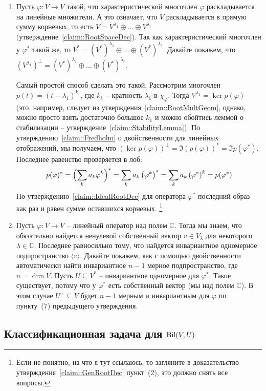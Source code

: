\begin{enumerate}
\item Пусть $\varphi\colon V\to V$ такой, что характеристический многочлен $\varphi$ раскладывается на линейные множители.
А это означает, что $V$ раскладывается в прямую сумму корневых, то есть $V = V^{\lambda_1}\oplus \ldots \oplus V^{\lambda_r}$ (утверждение~\ref{claim::RootSpaceDec}).
Так как характеристический многочлен у $\varphi^*$ такой же, то $V^* = (V^*)^{\lambda_1}\oplus \ldots \oplus (V^*)^{\lambda_r}$.
Давайте покажем, что $(V^{\lambda_1})^\bot = (V^*)^{\lambda_2}\oplus \ldots \oplus (V^*)^{\lambda_r}$.

Самый простой способ сделать это такой.
Рассмотрим многочлен $p(t) = (t-\lambda_1)^{k_1}$, где $k_1$ -- кратность $\lambda_1$ в $\chi_\varphi$.
Тогда $V^{\lambda_1} = \ker p(\varphi)$ (это, например, следует из утверждения~\ref{claim::RootMultGeom}, однако, можно просто взять достаточно большое $k_1$ и можно обойтись леммой о стабилизации -- утверждение~\ref{claim::StabilityLemma}).
По утверждению~\ref{claim::Fredholm} о двойственности для линейных отображений, мы получаем, что $(\ker p(\varphi))^\bot = \Im (p(\varphi))^* = \Im p(\varphi^*)$.
Последнее равенство проверяется в лоб:
\[
p(\varphi)^* =  \Bigl(\sum_ka_k\varphi^k\Bigr)^* = \sum_ka_k \left(\varphi^k\right)^* = \sum_k a_k \left(\varphi^*\right)^k = p(\varphi^*)
\]
По утверждению~\ref{claim::IdealRootDec} для оператора $\varphi^*$ последний образ как раз и равен сумме оставшихся корневых.%
\footnote{Если не понятно, на что я тут ссылаюсь, то загляните в доказательство утверждения~\ref{claim::GenRootDec} пункт~(2), это должно снять все вопросы.}

\item Пусть $\varphi\colon V\to V$ -- линейный оператор над полем $\mathbb C$.
Тогда мы знаем, что обязательно найдется ненулевой собственный вектор $v\in V_\lambda$ для некоторого $\lambda\in \mathbb C$.
Последнее равносильно тому, что найдется инвариантное одномерное подпространство $\langle v \rangle$.
Давайте покажем, как с помощью двойственности автоматически найти инвариантное $n - 1$ мерное подпространство, где $n = \dim V$.
Пусть $U\subseteq V^*$ -- инвариантное одномерное для $\varphi^*$.
Такое существует, потому что у $\varphi^*$ есть собственный вектор (мы над полем $\mathbb C$).
В этом случае $U^\bot\subseteq V$ будет $n-1$ мерным и инвариантным для $\varphi$ по пункту~(7) предыдущего утверждения.
\end{enumerate}

\subsection{Классификационная задача для $\operatorname{Bil}(V,U)$}

